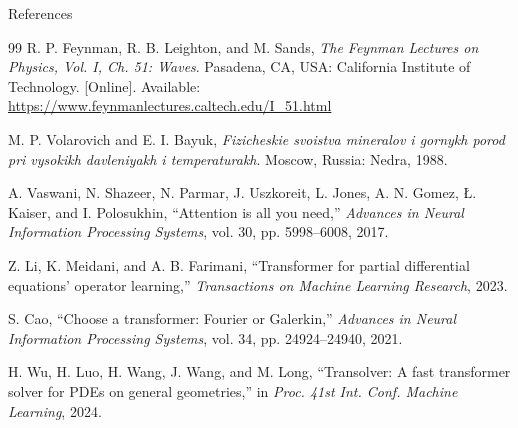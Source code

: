 \documentclass[aspectratio=169,10pt]{beamer}
\begin{document}
\begin{frame}[allowframebreaks]{References}
\begin{thebibliography}{99}
  R. P. Feynman, R. B. Leighton, and M. Sands,
  \textit{The Feynman Lectures on Physics, Vol. I, Ch. 51: Waves}.
  Pasadena, CA, USA: California Institute of Technology.
  [Online]. Available: \url{https://www.feynmanlectures.caltech.edu/I_51.html}

  M. P. Volarovich and E. I. Bayuk,
  \textit{Fizicheskie svoistva mineralov i gornykh porod pri vysokikh
  davleniyakh i temperaturakh}.
  Moscow, Russia: Nedra, 1988.

  A. Vaswani, N. Shazeer, N. Parmar, J. Uszkoreit, L. Jones, A. N. Gomez,
  \L. Kaiser, and I. Polosukhin,
  ``Attention is all you need,''
  \textit{Advances in Neural Information Processing Systems}, vol. 30,
  pp. 5998--6008, 2017.

  Z. Li, K. Meidani, and A. B. Farimani,
  ``Transformer for partial differential equations' operator learning,''
  \textit{Transactions on Machine Learning Research}, 2023.

  S. Cao,
  ``Choose a transformer: Fourier or Galerkin,''
  \textit{Advances in Neural Information Processing Systems}, vol. 34,
  pp. 24924--24940, 2021.

  H. Wu, H. Luo, H. Wang, J. Wang, and M. Long,
  ``Transolver: A fast transformer solver for PDEs on general geometries,''
  in \textit{Proc. 41st Int. Conf. Machine Learning}, 2024.

  \end{thebibliography}
\end{frame}
\end{document}
